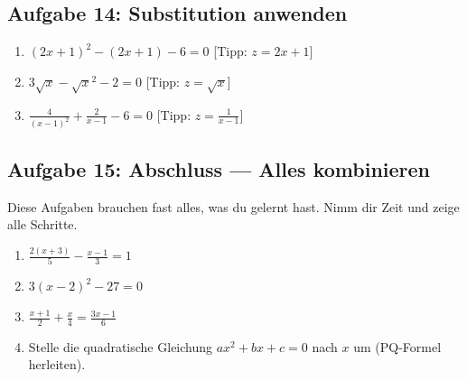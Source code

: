 \documentclass[12pt]{article}
\begin{document}
\subsection*{Aufgabe 14: Substitution anwenden}
\begin{enumerate}
  \item \((2x + 1)^2 - (2x + 1) - 6 = 0\) \hfill [Tipp: \(z = 2x + 1\)]
  \item \(3\sqrt{x} - \sqrt{x}^2 - 2 = 0\) \hfill [Tipp: \(z = \sqrt{x}\)]
  \item \(\frac{4}{(x-1)^2} + \frac{2}{x-1} - 6 = 0\) \hfill [Tipp: \(z = \frac{1}{x-1}\)]
\end{enumerate}

\subsection*{Aufgabe 15: Abschluss — Alles kombinieren}
Diese Aufgaben brauchen fast alles, was du gelernt hast. Nimm dir Zeit und zeige alle Schritte.
\begin{enumerate}
  \item \(\frac{2(x + 3)}{5} - \frac{x - 1}{3} = 1\)
  \item \(3(x - 2)^2 - 27 = 0\)
  \item \(\frac{x + 1}{2} + \frac{x}{4} = \frac{3x - 1}{6}\)
  \item Stelle die quadratische Gleichung \(ax^2 + bx + c = 0\) nach \(x\) um (PQ-Formel herleiten).
\end{enumerate}
\end{document}
